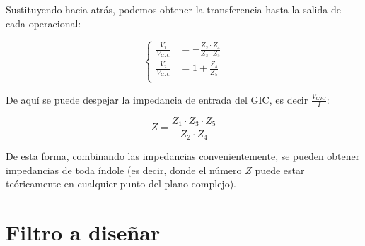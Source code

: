 \documentclass[../../tc_tp3_main.tex]{subfiles}
\begin{document}
 Sustituyendo hacia atr\'as, podemos obtener la transferencia hasta la salida de cada operacional:
 
\begin{equation}
	\label{eq:1-v1v2g}
	\left\{
 	\begin{aligned}
		\frac{V_1}{V_{GIC}} & =  -\frac{Z_2 \cdot Z_4}{Z_3 \cdot Z_5}\\
		\frac{V_2}{V_{GIC}} & =  1+ \frac{Z_4}{Z_5} \\ 
	\end{aligned}
	\right.
 \end{equation}
 
 
 
 De aqu\'i se puede despejar la impedancia de entrada del GIC, es decir $\frac{V_{GIC}}{I}$:
 
 \begin{equation}
 	\label{eq:1-z-gic-g}
 	Z = \frac{Z_1 \cdot Z_3 \cdot Z_5}{Z_2 \cdot Z_4}
 \end{equation}

De esta forma, combinando las impedancias convenientemente, se pueden obtener impedancias de toda \'indole (es decir, donde el n\'umero $Z$ puede estar te\'oricamente en cualquier punto del plano complejo). 





\section{Filtro a dise\~nar}
\end{document}
